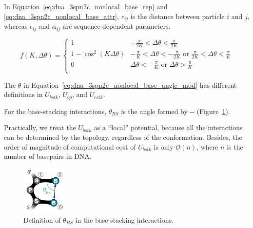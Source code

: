 In Equation~\ref{eq:dna_3spn2c_nonlocal_base_rep} and
\ref{eq:dna_3spn2c_nonlocal_base_attr}, $r_{ij}$ is the distance between
particle $i$ and $j$, whereas $\epsilon_{ij}$ and $\alpha_{ij}$ are sequence
dependent parameters.

\begin{equation}
  \label{eq:dna_3spn2c_nonlocal_base_angle_mod}
  f(K, \Delta \theta) =
  \begin{cases}
    1 & \displaystyle -\frac{\pi}{2K} < \Delta \theta < \frac{\pi}{2K} \\[.7em]
    1 - \cos^2(K\Delta\theta) & \displaystyle -\frac{\pi}{K} < \Delta \theta < -\frac{\pi}{2K} \textrm{ or } \frac{\pi}{2K} < \Delta \theta < \frac{\pi}{K} \\[.7em]
    0 & \displaystyle \Delta \theta < -\frac{\pi}{K} \textrm{ or }  \Delta \theta > \frac{\pi}{K} \\
  \end{cases}
\end{equation}

The $\theta$ in Equation~\ref{eq:dna_3spn2c_nonlocal_base_angle_mod} has
different definitions in $U_{bstk}$, $U_{bp}$, and $U_{cstk}$.

For the base-stacking interactions, $\theta_{BS}$ is the angle formed by
--
(Figure~\ref{fig:DNA_3spn2c_nonbonded_bstk}).

Practically, we treat the $U_{bstk}$ as a ``local'' potential, because all the
interactions can be determined by the topology, regardless of the conformation.
Besides, the order of magnitude of computational cost of $U_{bstk}$ is only
$\mathcal{O}(n)$, where $n$ is the number of basepairs in DNA.

\begin{figure}[ht]
  \centering
  \includegraphics[width=0.2\textwidth]{figures/DNA_3spn2c_nonbonded_bstk.png}
  \caption{Definition of $\theta_{BS}$ in the base-stacking interactions.}
  \label{fig:DNA_3spn2c_nonbonded_bstk}
\end{figure}

